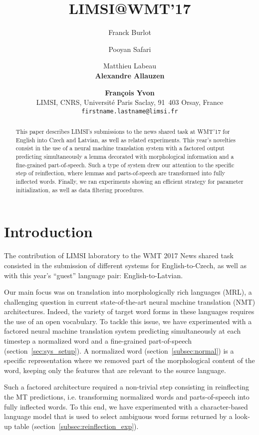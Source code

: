 \documentclass[11pt,letterpaper,final]{article}
\title{LIMSI@WMT'17}
\author{Franck Burlot \and Pooyan Safari \and Matthieu Labeau \\
  {\bf Alexandre Allauzen} \and {\bf Fran\c{c}ois Yvon} \\
LIMSI, CNRS, Universit\'{e} Paris Saclay, 91~403 Orsay, France \\
  {\tt firstname.lastname@limsi.fr}}
\date{}
\begin{document}
\maketitle

\begin{abstract}
  This paper describes LIMSI's submissions to the news shared task
  at WMT'17 for English into Czech and Latvian, as well as related experiments. This year's novelties
  consist in the use of a neural machine translation system with a factored
  output predicting simultaneously a lemma decorated with morphological
  information and a fine-grained part-of-speech. Such a type of system
  drew our attention to the specific step of reinflection, where
  lemmas and parts-of-speech are transformed into fully inflected words.
  Finally, we ran experiments showing an efficient strategy for parameter initialization,
  as well as data filtering procedures.
\end{abstract}


\section{Introduction}

The contribution of LIMSI laboratory to the WMT 2017 News
shared task consisted in the submission of different
systems for English-to-Czech, as well as with this year's ``guest''
language pair: English-to-Latvian.

Our main focus was on translation into morphologically
rich languages (MRL), a challenging question in current
state-of-the-art neural machine translation (NMT) architectures.
Indeed, the variety of target word forms in these languages requires the
use of an open vocabulary. To tackle this issue,
we have experimented with a factored neural machine translation
system predicting simultaneously at each timestep a normalized word
and a fine-grained part-of-speech (section~\ref{sec:sys_setup}).
A normalized word (section~\ref{subsec:normal}) is a
specific representation where we removed part of the morphological
content of the word, keeping only the features that are relevant
to the source language.

Such a factored architecture required a non-trivial step
consisting in reinflecting the MT predictions, i.e. transforming
normalized words and parts-of-speech into fully inflected words.
To this end, we have experimented with a character-based language
model that is used to select ambiguous word forms returned
by a look-up table (section~\ref{subsec:reinflection_exp}).
\end{document}

